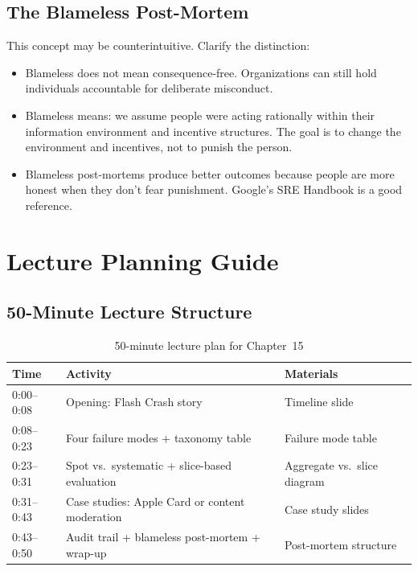 \subsection{The Blameless Post-Mortem}

This concept may be counterintuitive. Clarify the distinction:
\begin{itemize}
    \item Blameless does not mean consequence-free. Organizations can still hold individuals accountable for deliberate misconduct.
    \item Blameless means: we assume people were acting rationally within their information environment and incentive structures. The goal is to change the environment and incentives, not to punish the person.
    \item Blameless post-mortems produce better outcomes because people are more honest when they don't fear punishment. Google's SRE Handbook is a good reference.
\end{itemize}

\section{Lecture Planning Guide}

\subsection{50-Minute Lecture Structure}

\begin{table}[htbp]
\caption{50-minute lecture plan for Chapter~15}
\label{tab:lecture-plan-ch15}
\centering
\begin{tabular}{@{}p{2.5cm}p{6cm}p{3.5cm}@{}}
\toprule
\textbf{Time} & \textbf{Activity} & \textbf{Materials} \\
\midrule
0:00--0:08 & Opening: Flash Crash story & Timeline slide \\
0:08--0:23 & Four failure modes + taxonomy table & Failure mode table \\
0:23--0:31 & Spot vs.\ systematic + slice-based evaluation & Aggregate vs.\ slice diagram \\
0:31--0:43 & Case studies: Apple Card or content moderation & Case study slides \\
0:43--0:50 & Audit trail + blameless post-mortem + wrap-up & Post-mortem structure \\
\bottomrule
\end{tabular}
\end{table}

